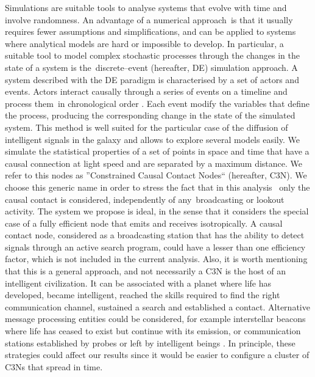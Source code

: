 \documentclass[crop]{CSLB}
\newcommand{\ceti}{C3N}
\newcommand{\cetis}{C3Ns}
\begin{document}
Simulations are suitable tools to analyse systems that evolve with time and
involve randomness.
%
An advantage of a numerical approach is that it usually requires fewer assumptions
and simplifications, and can be applied to systems where analytical models are
hard or impossible to develop.
%
In particular, a suitable tool to model complex stochastic processes through
the changes in the state of a system is the discrete--event (hereafter, DE)
simulation approach.
%
A system described with the DE paradigm is characterised by a set of actors and
events.
%
Actors interact causally through a series of events on a timeline and process
them in chronological order \citep{ptolemaeus_system_2014,
chung_simulation_2003, ross_simulation_2012}.
%
Each event modify the variables that define the process, producing the
corresponding change in the state of the simulated system.
%
This method is well suited for the particular case of the diffusion of
intelligent signals in the galaxy and allows to explore several models easily.
%
We simulate the statistical properties of a set of points in space and time
that have a causal connection at light speed and are separated
by a maximum distance.
%
We refer to this nodes as ''Constrained Causal Contact Nodes``
(hereafter, \ceti{}).
%
We choose this generic name in order to stress the fact that in this analysis 
only the causal contact is considered, independently of any broadcasting or
lookout activity.
%
The system we propose is ideal, in the sense that it considers the special case
of a fully efficient node that emits and receives isotropically.
%
A causal contact node, considered as a broadcasting station that has the
ability to detect signals through an active search program, could have a
lesser than one efficiency factor, which is not included in the current
analysis.
%
Also, it is worth mentioning that this is a general approach, and not
necessarily a \ceti{} is the host of an intelligent civilization.
%
It can be associated with a planet where life has developed,
became intelligent, reached the skills required to find the right communication
channel, sustained a search and established a contact.
%
Alternative message processing entities could be considered, for example
interstellar beacons where life has ceased to exist but continue with its
emission, or communication stations established by probes or left by
intelligent beings \citep[see, e.g., ][]{peters_outer_2018,
barlow_galactic_2013}.
%
In principle, these strategies could affect our results since it would be
easier to configure a cluster of \cetis{} that spread in time.
\end{document}
